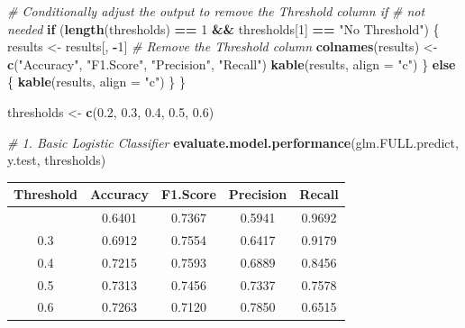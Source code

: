 \documentclass[
  10pt,
  paper=a4,
  ,captions=tableheading
]{scrartcl}
\newenvironment{Shaded}{\begin{snugshade}}{\end{snugshade}}
\newcommand{\AttributeTok}[1]{\textcolor[rgb]{0.13,0.29,0.53}{#1}}
\newcommand{\CommentTok}[1]{\textcolor[rgb]{0.56,0.35,0.01}{\textit{#1}}}
\newcommand{\ControlFlowTok}[1]{\textcolor[rgb]{0.13,0.29,0.53}{\textbf{#1}}}
\newcommand{\DecValTok}[1]{\textcolor[rgb]{0.00,0.00,0.81}{#1}}
\newcommand{\FloatTok}[1]{\textcolor[rgb]{0.00,0.00,0.81}{#1}}
\newcommand{\FunctionTok}[1]{\textcolor[rgb]{0.13,0.29,0.53}{\textbf{#1}}}
\newcommand{\NormalTok}[1]{#1}
\newcommand{\OtherTok}[1]{\textcolor[rgb]{0.56,0.35,0.01}{#1}}
\newcommand{\SpecialCharTok}[1]{\textcolor[rgb]{0.81,0.36,0.00}{\textbf{#1}}}
\newcommand{\StringTok}[1]{\textcolor[rgb]{0.31,0.60,0.02}{#1}}
\begin{document}
\begin{Shaded}
\begin{Highlighting}[]
    \CommentTok{\# Conditionally adjust the output to remove the Threshold column if}
    \CommentTok{\# not needed}
    \ControlFlowTok{if}\NormalTok{ (}\FunctionTok{length}\NormalTok{(thresholds) }\SpecialCharTok{==} \DecValTok{1} \SpecialCharTok{\&\&}\NormalTok{ thresholds[}\DecValTok{1}\NormalTok{] }\SpecialCharTok{==} \StringTok{"No Threshold"}\NormalTok{) \{}
\NormalTok{        results }\OtherTok{\textless{}{-}}\NormalTok{ results[, }\SpecialCharTok{{-}}\DecValTok{1}\NormalTok{]  }\CommentTok{\# Remove the Threshold column}
        \FunctionTok{colnames}\NormalTok{(results) }\OtherTok{\textless{}{-}} \FunctionTok{c}\NormalTok{(}\StringTok{"Accuracy"}\NormalTok{, }\StringTok{"F1.Score"}\NormalTok{, }\StringTok{"Precision"}\NormalTok{, }\StringTok{"Recall"}\NormalTok{)}
        \FunctionTok{kable}\NormalTok{(results, }\AttributeTok{align =} \StringTok{"c"}\NormalTok{)}
\NormalTok{    \} }\ControlFlowTok{else}\NormalTok{ \{}
        \FunctionTok{kable}\NormalTok{(results, }\AttributeTok{align =} \StringTok{"c"}\NormalTok{)}
\NormalTok{    \}}
\NormalTok{\}}
\end{Highlighting}
\end{Shaded}

\small

\small

\begin{Shaded}
\begin{Highlighting}[]
\NormalTok{thresholds }\OtherTok{\textless{}{-}} \FunctionTok{c}\NormalTok{(}\FloatTok{0.2}\NormalTok{, }\FloatTok{0.3}\NormalTok{, }\FloatTok{0.4}\NormalTok{, }\FloatTok{0.5}\NormalTok{, }\FloatTok{0.6}\NormalTok{)}

\CommentTok{\# 1. Basic Logistic Classifier}
\FunctionTok{evaluate.model.performance}\NormalTok{(glm.FULL.predict, y.test, thresholds)}
\end{Highlighting}
\end{Shaded}

\begin{longtable}[]{@{}ccccc@{}}
\toprule\noalign{}
Threshold & Accuracy & F1.Score & Precision & Recall \\
\midrule\noalign{}
\endhead
\bottomrule\noalign{}
\endlastfoot
0.2 & 0.6401 & 0.7367 & 0.5941 & 0.9692 \\
0.3 & 0.6912 & 0.7554 & 0.6417 & 0.9179 \\
0.4 & 0.7215 & 0.7593 & 0.6889 & 0.8456 \\
0.5 & 0.7313 & 0.7456 & 0.7337 & 0.7578 \\
0.6 & 0.7263 & 0.7120 & 0.7850 & 0.6515 \\
\end{longtable}
\end{document}
